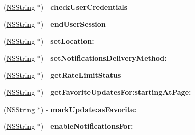 \begin{DoxyCompactItemize}
\item 
\hypertarget{interface_m_g_twitter_engine_a35842c057f70b8a85e85e66f5cdde346}{
(\hyperlink{class_n_s_string}{\-N\-S\-String} $\ast$) -\/ {\bfseries check\-User\-Credentials}}
\label{interface_m_g_twitter_engine_a35842c057f70b8a85e85e66f5cdde346}

\item 
\hypertarget{interface_m_g_twitter_engine_acb2e2bd41aafada909bfabd60c9e61de}{
(\hyperlink{class_n_s_string}{\-N\-S\-String} $\ast$) -\/ {\bfseries end\-User\-Session}}
\label{interface_m_g_twitter_engine_acb2e2bd41aafada909bfabd60c9e61de}

\item 
\hypertarget{interface_m_g_twitter_engine_a1e3a796f8dcf1d305cfd005eb509b49a}{
(\hyperlink{class_n_s_string}{\-N\-S\-String} $\ast$) -\/ {\bfseries set\-Location\-:}}
\label{interface_m_g_twitter_engine_a1e3a796f8dcf1d305cfd005eb509b49a}

\item 
\hypertarget{interface_m_g_twitter_engine_a8c669251e204ed7eaea3b0e7cafcd926}{
(\hyperlink{class_n_s_string}{\-N\-S\-String} $\ast$) -\/ {\bfseries set\-Notifications\-Delivery\-Method\-:}}
\label{interface_m_g_twitter_engine_a8c669251e204ed7eaea3b0e7cafcd926}

\item 
\hypertarget{interface_m_g_twitter_engine_add8d28f4ced666f4019774fe42bb8a4d}{
(\hyperlink{class_n_s_string}{\-N\-S\-String} $\ast$) -\/ {\bfseries get\-Rate\-Limit\-Status}}
\label{interface_m_g_twitter_engine_add8d28f4ced666f4019774fe42bb8a4d}

\item 
\hypertarget{interface_m_g_twitter_engine_a9ed6e1d90d6005ae8bed71d8a6998ebe}{
(\hyperlink{class_n_s_string}{\-N\-S\-String} $\ast$) -\/ {\bfseries get\-Favorite\-Updates\-For\-:starting\-At\-Page\-:}}
\label{interface_m_g_twitter_engine_a9ed6e1d90d6005ae8bed71d8a6998ebe}

\item 
\hypertarget{interface_m_g_twitter_engine_af22def121aeacf357915b6da4b171369}{
(\hyperlink{class_n_s_string}{\-N\-S\-String} $\ast$) -\/ {\bfseries mark\-Update\-:as\-Favorite\-:}}
\label{interface_m_g_twitter_engine_af22def121aeacf357915b6da4b171369}

\item 
\hypertarget{interface_m_g_twitter_engine_a132710c7d7b694aefd78b28787f470f4}{
(\hyperlink{class_n_s_string}{\-N\-S\-String} $\ast$) -\/ {\bfseries enable\-Notifications\-For\-:}}
\label{interface_m_g_twitter_engine_a132710c7d7b694aefd78b28787f470f4}


\end{DoxyCompactItemize}
